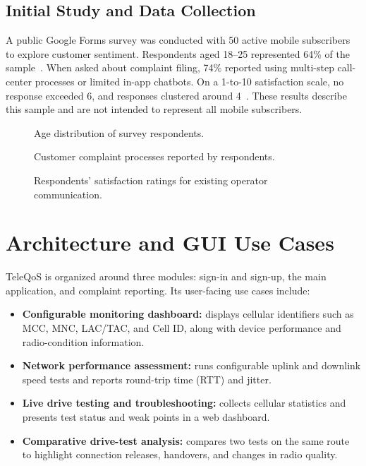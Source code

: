 \documentclass[conference]{IEEEtran}
\newcommand{\figureplaceholder}[1]{%
  \fbox{\parbox[c][1.1in][c]{0.9\columnwidth}{\centering\small #1}}%
}
\begin{document}
\subsection{Initial Study and Data Collection}
A public Google Forms survey was conducted with 50 active mobile subscribers to explore customer sentiment. Respondents aged 18--25 represented 64\% of the sample~\cite{vieruThesis}. When asked about complaint filing, 74\% reported using multi-step call-center processes or limited in-app chatbots. On a 1-to-10 satisfaction scale, no response exceeded 6, and responses clustered around 4~\cite{vieruThesis}. These results describe this sample and are not intended to represent all mobile subscribers.

\begin{figure}[!t]
  \centering
  \figureplaceholder{Image}
  \caption{Age distribution of survey respondents.}
  \label{fig:age-distribution}
\end{figure}

\begin{figure}[!t]
  \centering
  \figureplaceholder{Image}
  \caption{Customer complaint processes reported by respondents.}
  \label{fig:complaint-process}
\end{figure}

\begin{figure}[!t]
  \centering
  \figureplaceholder{Image}
  \caption{Respondents' satisfaction ratings for existing operator communication.}
  \label{fig:satisfaction}
\end{figure}

\section{Architecture and GUI Use Cases}
TeleQoS is organized around three modules: sign-in and sign-up, the main application, and complaint reporting. Its user-facing use cases include:
\begin{itemize}
  \item \textbf{Configurable monitoring dashboard:} displays cellular identifiers such as MCC, MNC, LAC/TAC, and Cell ID, along with device performance and radio-condition information.
  \item \textbf{Network performance assessment:} runs configurable uplink and downlink speed tests and reports round-trip time (RTT) and jitter.
  \item \textbf{Live drive testing and troubleshooting:} collects cellular statistics and presents test status and weak points in a web dashboard.
  \item \textbf{Comparative drive-test analysis:} compares two tests on the same route to highlight connection releases, handovers, and changes in radio quality.
\end{itemize}
\end{document}
